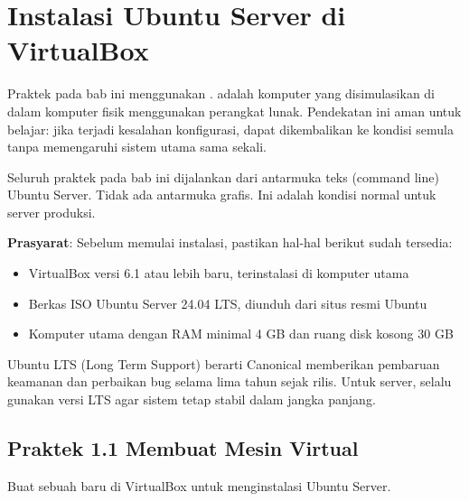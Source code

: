 \section{Instalasi Ubuntu Server di VirtualBox}
\label{sec:installation}

Praktek pada bab ini menggunakan \textbf{}. 
adalah komputer yang disimulasikan di dalam komputer fisik menggunakan perangkat
lunak. Pendekatan ini aman untuk belajar: jika terjadi kesalahan konfigurasi, 
dapat dikembalikan ke kondisi semula tanpa memengaruhi sistem utama sama sekali.

\begin{notebox}
Seluruh praktek pada bab ini dijalankan dari antarmuka teks (command line) Ubuntu
Server. Tidak ada antarmuka grafis. Ini adalah kondisi normal untuk server produksi.
\end{notebox}

\textbf{Prasyarat}: Sebelum memulai instalasi, pastikan hal-hal berikut sudah tersedia:

\begin{itemize}
    \item VirtualBox versi 6.1 atau lebih baru, terinstalasi di komputer utama
    \item Berkas ISO Ubuntu Server 24.04 LTS, diunduh dari situs resmi Ubuntu
    \item Komputer utama dengan RAM minimal 4 GB dan ruang disk kosong 30 GB
\end{itemize}

\begin{tipbox}
Ubuntu LTS (Long Term Support) berarti Canonical memberikan pembaruan keamanan dan
perbaikan bug selama lima tahun sejak rilis. Untuk server, selalu gunakan versi LTS
agar sistem tetap stabil dalam jangka panjang.
\end{tipbox}

\subsection*{Praktek 1.1 Membuat Mesin Virtual}

Buat sebuah  baru di VirtualBox untuk menginstalasi Ubuntu Server.

